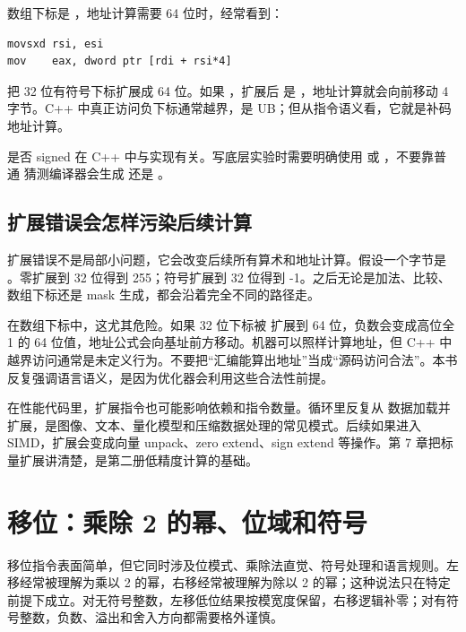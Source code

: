 数组下标是 ，地址计算需要 64 位时，经常看到：

\begin{lstlisting}
movsxd rsi, esi
mov    eax, dword ptr [rdi + rsi*4]
\end{lstlisting}

 把 32 位有符号下标扩展成 64 位。如果 ，扩展后  是 ，地址计算就会向前移动 4 字节。C++ 中真正访问负下标通常越界，是 UB；但从指令语义看，它就是补码地址计算。

\begin{warningbox}
 是否 signed 在 C++ 中与实现有关。写底层实验时需要明确使用  或 ，不要靠普通  猜测编译器会生成  还是 。
\end{warningbox}

\subsection{扩展错误会怎样污染后续计算}

扩展错误不是局部小问题，它会改变后续所有算术和地址计算。假设一个字节是 。零扩展到 32 位得到 255；符号扩展到 32 位得到 -1。之后无论是加法、比较、数组下标还是 mask 生成，都会沿着完全不同的路径走。

在数组下标中，这尤其危险。如果 32 位下标被  扩展到 64 位，负数会变成高位全 1 的 64 位值，地址公式会向基址前方移动。机器可以照样计算地址，但 C++ 中越界访问通常是未定义行为。不要把“汇编能算出地址”当成“源码访问合法”。本书反复强调语言语义，是因为优化器会利用这些合法性前提。

在性能代码里，扩展指令也可能影响依赖和指令数量。循环里反复从  数据加载并扩展，是图像、文本、量化模型和压缩数据处理的常见模式。后续如果进入 SIMD，扩展会变成向量 unpack、zero extend、sign extend 等操作。第 7 章把标量扩展讲清楚，是第二册低精度计算的基础。

\section{移位：乘除 2 的幂、位域和符号}

移位指令表面简单，但它同时涉及位模式、乘除法直觉、符号处理和语言规则。左移经常被理解为乘以 2 的幂，右移经常被理解为除以 2 的幂；这种说法只在特定前提下成立。对无符号整数，左移低位结果按模宽度保留，右移逻辑补零；对有符号整数，负数、溢出和舍入方向都需要格外谨慎。

